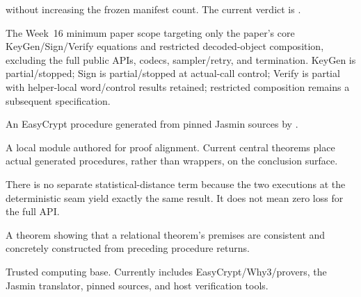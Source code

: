 \begin{description}[style=nextline,leftmargin=3.1cm]
  without increasing the frozen manifest count. The current verdict is
  .
  \item[MINCORE] The Week~16 minimum paper scope targeting only the paper's core
  KeyGen/Sign/Verify equations and restricted decoded-object composition,
  excluding the full public APIs, codecs, sampler/retry, and termination. KeyGen
  is partial/stopped; Sign is partial/stopped at actual-call control; Verify is
  partial with helper-local word/control results retained; restricted composition
  remains a subsequent specification.
  \item[Generated procedure] An EasyCrypt procedure generated from pinned Jasmin
  sources by .
  \item[Wrapper] A local module authored for proof alignment. Current central
  theorems place actual generated procedures, rather than wrappers, on the conclusion surface.
  \item[Zero loss] There is no separate statistical-distance term because the
  two executions at the deterministic seam yield exactly the same result.
  It does not mean zero loss for the full API.
  \item[Reachability witness] A theorem showing that a relational theorem's
  premises are consistent and concretely constructed from preceding procedure returns.
  \item[TCB] Trusted computing base. Currently includes EasyCrypt/Why3/provers,
  the Jasmin translator, pinned sources, and host verification tools.
\end{description}

